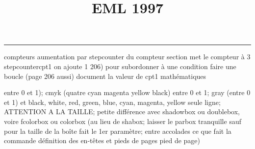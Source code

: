 \documentclass[11pt]{article}%
\title{\bf \vspace{-2cm} EML 1997} %
\author{} %
\date{} %
\renewcommand{\headrulewidth}{0pt}%
\renewcommand{\footrulewidth}{0.4pt}%
\begin{document}
\maketitle %
\vspace{-1.4cm}\hrule %
\thispagestyle{fancy}

\vspace*{.2cm}



compteurs%
aumentation par stepcounter du compteur section%
met le compteur à 3%
stepcounter{cpt1} on ajoute 1%
206) pour subordonner à une condition %
faire une boucle (page 206 aussi) %
document la valeur de cpt1 
mathématiques\newcommand{\ch}{\operatorname{ch}} 
\newcommand{\sh}{\operatorname{sh}}
\renewcommand{\tanh}{\operatorname{th}}
\renewcommand{\sinh}{\operatorname{sh}}
\renewcommand{\cosh}{\operatorname{ch}}
\newcommand{\argsh}{\operatorname{argsh}}
\newcommand{\argch}{\operatorname{argch}}
\newcommand{\argth}{\operatorname{argth}}
\newcommand{\ker}{\operatorname{Ker}}
\renewcommand{\im}{\operatorname{Im}}
\newcommand{\rg}{\operatorname{rg}}
\newcommand{\Id}{\operatorname{Id}}
\newcommand{\id}{\operatorname{id}}
\renewcommand{\leq}{\leq}
\renewcommand{\geq}{\geq }

entre 0 et 1); cmyk (quatre cyan magenta yellow black) entre 0 et 1;
gray (entre 0 et 1) et black, white, red, green, blue, cyan, magenta,
yellow%
seule ligne; ATTENTION A LA TAILLE; petite différence avec shadowbox ou
doublebox, voire fcolorbox ou colorbox (au lieu de shabox; laisser le
parbox tranquille sauf pour la taille de la boîte
\newcommand{\Tbox}[1]{\begin{center} \shabox{\parbox{0.6
\linewidth}{#1}} \end{center}} %
fait le 1er paramètre; entre accolades ce que fait la commande
définition des en-têtes et pieds de pages\pagestyle{fancy}
\chead{}
\rfoot[ \ \thepage]{\thepage}
\cfoot{}
\lfoot{}
\thispagestyle{fancy} %
pied de page)\renewcommand{\footrulewidth}{0.4pt}
\renewcommand{\headrulewidth}{0.4pt}
\end{document}
